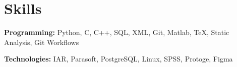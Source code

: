 \documentclass{../templates/simplecv}
\begin{document}
    \resumeItemListEnd 
    \resumeSubHeadingListEnd

\section{Skills}
\vspace{3pt}
\resumeSubHeadingListStart
\small{\item{
    \textbf{Programming: }{Python, C, C++, SQL, XML, Git, Matlab, TeX, Static Analysis, Git Workflows} \\ \vspace{3pt}

    \textbf{Technologies: }{IAR, Parasoft, PostgreSQL, Linux, SPSS, Protoge, Figma}
}}
\resumeSubHeadingListEnd
\end{document}
